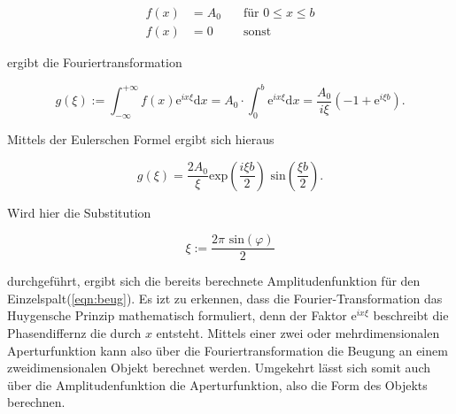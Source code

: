         \begin{align*}
            f(x) & = A_0 \quad & \text{für } 0\leq x \leq b\\
            f(x) & = 0 \quad & \text{sonst}
        \end{align*}

        \noindent ergibt die Fouriertransformation

        \begin{equation*}
            g(\xi) := \int_{-\infty}^{+\infty} f(x) \text{e}^{i x \xi} \text{d} x = A_0 \cdot \int_0^b \text{e}^{i x \xi} \text{d} x =
            \frac{A_0}{i \xi} \left( -1 + \text{e}^{i \xi b} \right) .
        \end{equation*}

        \noindent Mittels der Eulerschen Formel ergibt sich hieraus 

        \begin{equation*}
            g(\xi) = \frac{2 A_0}{\xi} \text{exp} \left( \frac{i \xi b}{2} \right) \text{ sin} \left( \frac{\xi b}{2} \right) .
        \end{equation*}

        \noindent Wird hier die Substitution 

        \begin{equation}
            \xi := \frac{2 \pi \text{ sin}(\varphi)}{2} 
        \end{equation}

        \noindent durchgeführt, ergibt sich die bereits berechnete Amplitudenfunktion für den Einzelspalt(\ref{eqn:beug}).
        Es izt zu erkennen, dass die Fourier-Transformation das Huygensche Prinzip mathematisch formuliert, denn der Faktor 
        $\text{e}^{i x \xi}$ beschreibt die Phasendiffernz die durch $x$ entsteht. Mittels einer zwei oder mehrdimensionalen 
        Aperturfunktion kann also über die Fouriertransformation die Beugung an einem zweidimensionalen Objekt berechnet werden. 
        Umgekehrt lässt sich somit auch über die Amplitudenfunktion die Aperturfunktion, also die Form des Objekts berechnen.


        



    





    